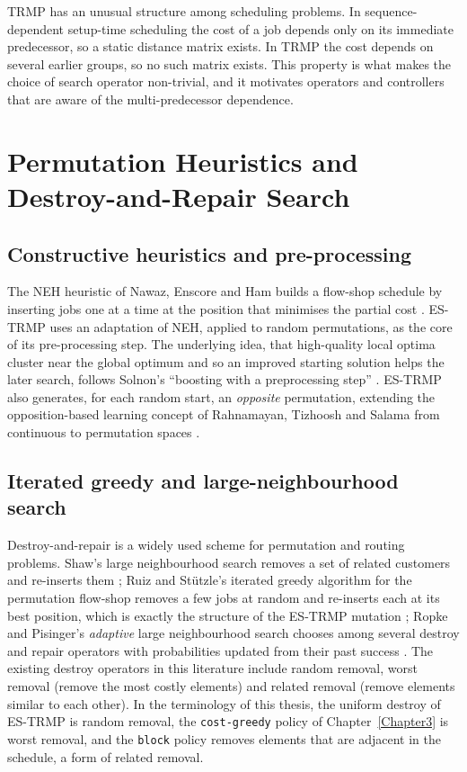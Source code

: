 TRMP has an unusual structure among scheduling problems. In sequence-dependent setup-time scheduling the cost of a job depends only on its immediate predecessor, so a static distance matrix exists. In TRMP the cost depends on several earlier groups, so no such matrix exists. This property is what makes the choice of search operator non-trivial, and it motivates operators and controllers that are aware of the multi-predecessor dependence.


\section{Permutation Heuristics and Destroy-and-Repair Search}\label{sec:lit-dr}

\subsection{Constructive heuristics and pre-processing}

The NEH heuristic of Nawaz, Enscore and Ham builds a flow-shop schedule by inserting jobs one at a time at the position that minimises the partial cost \cite{nawaz1983}. ES-TRMP uses an adaptation of NEH, applied to random permutations, as the core of its pre-processing step. The underlying idea, that high-quality local optima cluster near the global optimum and so an improved starting solution helps the later search, follows Solnon's \enquote{boosting with a preprocessing step} \cite{solnon2002}. ES-TRMP also generates, for each random start, an \emph{opposite} permutation, extending the opposition-based learning concept of Rahnamayan, Tizhoosh and Salama from continuous to permutation spaces \cite{rahnamayan2008}.

\subsection{Iterated greedy and large-neighbourhood search}

Destroy-and-repair is a widely used scheme for permutation and routing problems. Shaw's large neighbourhood search removes a set of related customers and re-inserts them \cite{shaw1998}; Ruiz and St{\"u}tzle's iterated greedy algorithm for the permutation flow-shop removes a few jobs at random and re-inserts each at its best position, which is exactly the structure of the ES-TRMP mutation \cite{ruiz2007}; Ropke and Pisinger's \emph{adaptive} large neighbourhood search chooses among several destroy and repair operators with probabilities updated from their past success \cite{ropke2006}. The existing destroy operators in this literature include random removal, worst removal (remove the most costly elements) and related removal (remove elements similar to each other). In the terminology of this thesis, the uniform destroy of ES-TRMP is random removal, the \texttt{cost-greedy} policy of Chapter~\ref{Chapter3} is worst removal, and the \texttt{block} policy removes elements that are adjacent in the schedule, a form of related removal.

